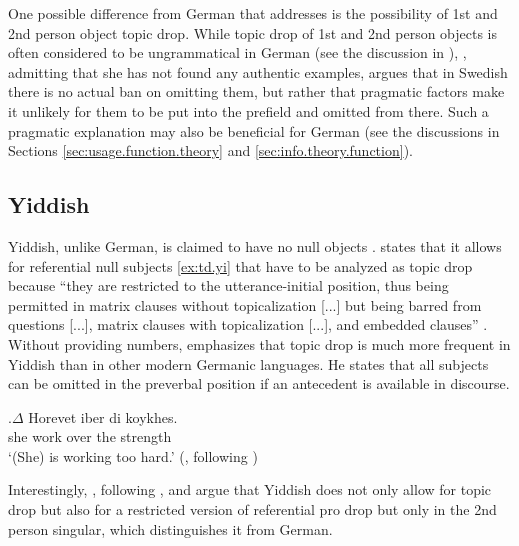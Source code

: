 One possible difference from German that \citet{mornsjo2002} addresses is the possibility of 1st and 2nd person object topic drop.
While topic drop of 1st and 2nd person objects is often considered to be ungrammatical in German (see the discussion in ), \citet[70--73]{mornsjo2002}, admitting that she has not found any authentic examples, argues that in Swedish there is no actual ban on omitting them, but rather that pragmatic factors make it unlikely for them to be put into the prefield and omitted from there.
Such a pragmatic explanation may also be beneficial for German (see the discussions in Sections \ref{sec:usage.function.theory} and \ref{sec:info.theory.function}).

\subsection{Yiddish} 
Yiddish, unlike German, is claimed to have no null objects \citep[342]{vanderwurff1996}.
\citet{rohrbacher1999} states that it allows for referential null subjects \ref{ex:td.yi} that have to be analyzed as topic drop because ``they are restricted to the utterance-initial position, thus being permitted in matrix clauses without topicalization [...] but being barred from questions [...], matrix clauses with topicalization [...], and embedded  clauses'' \citep[253]{rohrbacher1999}.
Without providing numbers, \citet[437]{rosenkvist2012} emphasizes that topic drop is much more frequent in Yiddish than in other modern Germanic languages.
He states that all subjects can be omitted in the preverbal position if an antecedent  is available in discourse.

\exg.\label{ex:td.yi}$\Delta$ Horevet iber di koykhes.\\
she work over the strength\\
`(She) is working too hard.' (\cite[254]{rohrbacher1999}, following \cite[83]{prince1999})

Interestingly, \citet{rohrbacher1999}, following \citet{prince1999}, and \citet{rosenkvist2012} argue that Yiddish does not only allow for topic drop but also for a restricted version of referential pro drop but only in the 2nd person singular, which distinguishes it from German. 


